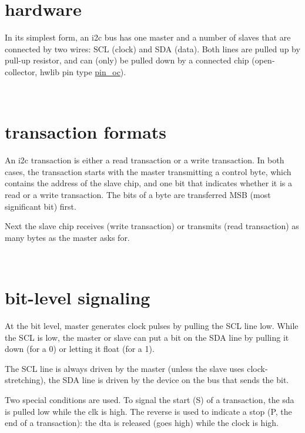 \hypertarget{i2c_i2c-hardware}{}\section{hardware}\label{i2c_i2c-hardware}
In its simplest form, an i2c bus has one master and a number of slaves that are connected by two wires\+: S\+CL (clock) and S\+DA (data). Both lines are pulled up by pull-\/up resistor, and can (only) be pulled down by a connected chip (open-\/collector, hwlib pin type \hyperlink{classhwlib_1_1pin__oc}{pin\+\_\+oc}).



~\newline
 

\hypertarget{i2c_i2c-transaction-format}{}\section{transaction formats}\label{i2c_i2c-transaction-format}
An i2c transaction is either a read transaction or a write transaction. In both cases, the transaction starts with the master transmitting a control byte, which contains the address of the slave chip, and one bit that indicates whether it is a read or a write transaction. The bits of a byte are transferred M\+SB (most significant bit) first.





Next the slave chip receives (write transaction) or transmits (read transaction) as many bytes as the master asks for.



~\newline
 

\hypertarget{i2c_i2c-bits}{}\section{bit-\/level signaling}\label{i2c_i2c-bits}
At the bit level, master generates clock pulses by pulling the S\+CL line low. While the S\+CL is low, the master or slave can put a bit on the S\+DA line by pulling it down (for a 0) or letting it float (for a 1).

The S\+CL line is always driven by the master (unless the slave uses clock-\/stretching), the S\+DA line is driven by the device on the bus that sends the bit.



Two special conditions are used. To signal the start (S) of a transaction, the sda is pulled low while the clk is high. The reverse is used to indicate a stop (P, the end of a transaction)\+: the dta is released (goes high) while the clock is high.



